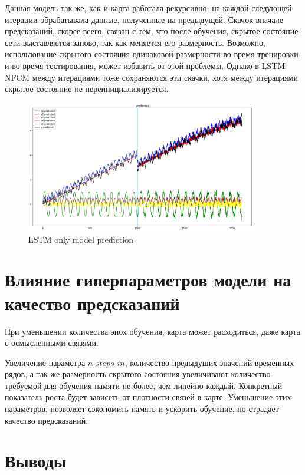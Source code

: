 Данная модель так же, как и карта работала рекурсивно:
на каждой следующей итерации обрабатывала данные, полученные на предыдущей.
Скачок вначале предсказаний, скорее всего, связан с тем, что после обучения,
скрытое состояние сети выставляется заново, так как меняется его размерность.
Возможно, использование скрытого состояния одинаковой размерности во время
тренировки и во время тестирования, может избавить от этой проблемы. Однако
в LSTM NFCM между итерациями тоже сохраняются эти скачки, хотя между итерациями
скрытое состояние не переинициализируется.

\begin{figure}[t]
	\centering
	\includegraphics[width=0.9\textwidth]{./img/lstm_only_prediction.png}
	\caption{LSTM only model prediction}
	\label{img:lstm_only_prediction}
\end{figure}

\section{Влияние гиперпараметров модели на качество предсказаний}


При уменьшении количества эпох обучения, карта может расходиться, даже карта с осмысленными связями.

Увеличение параметра $ n\_steps\_in $, количество предыдущих значений временных рядов,
а так же размерность скрытого состояния увеличивают количество требуемой для обучения
памяти не более, чем линейно каждый. Конкретный показатель роста будет зависеть от
плотности связей в карте.
Уменьшение этих параметров, позволяет сэкономить память и ускорить обучение,
но страдает качество предсказаний.


\section{Выводы}

